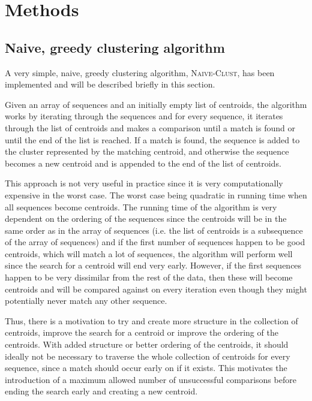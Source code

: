 \section{Methods} \label{sec:methods}





\subsection{Naive, greedy clustering algorithm}

A very simple, naive, greedy clustering algorithm, \textsc{Naive-Clust}, has
been implemented and will be described briefly in this section.

Given an array of sequences and an initially empty list of centroids, the
algorithm works by iterating through the sequences and for every sequence, it
iterates through the list of centroids and makes a comparison until a match is
found or until the end of the list is reached. If a match is found, the
sequence is added to the cluster represented by the matching centroid, and
otherwise the sequence becomes a new centroid and is appended to the end of the
list of centroids.

This approach is not very useful in practice since it is very computationally
expensive in the worst case. The worst case being quadratic in running time
when all sequences become centroids. The running time of the algorithm is very
dependent on the ordering of the sequences since the centroids will be in the
same order as in the array of sequences (i.e. the list of centroids is a
subsequence of the array of sequences) and if the first number of sequences
happen to be good centroids, which will match a lot of sequences, the algorithm
will perform well since the search for a centroid will end very early. However,
if the first sequences happen to be very dissimilar from the rest of the data,
then these will become centroids and will be compared against on every
iteration even though they might potentially never match any other sequence.

Thus, there is a motivation to try and create more structure in the collection
of centroids, improve the search for a centroid or improve the ordering of the
centroids. With added structure or better ordering of the centroids, it should
ideally not be necessary to traverse the whole collection of centroids for
every sequence, since a match should occur early on if it exists. This
motivates the introduction of a maximum allowed number of unsuccessful
comparisons before ending the search early and creating a new centroid.


